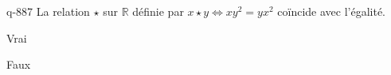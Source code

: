 \begin{truefalse}{q-887}
La relation $\star$ sur $\mathbb R$ définie par $x\star y \iff xy^2=yx^2$ coïncide avec l'égalité.
\item Vrai
\item* Faux
\end{truefalse}

